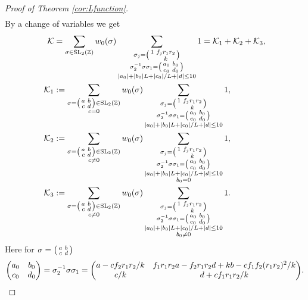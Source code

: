 \documentclass[12pt]{amsart}
\theoremstyle{definition}
\theoremstyle{remark}
\numberwithin{equation}{section}
\newcommand{\Z}{{\mathbb Z}}
\newcommand{\1}{{\mathbf 1}}
\newcommand{\SL}{\operatorname{SL}_2}
\renewcommand{\c}{\mathfrak c}
\begin{document}
\begin{proof}[Proof of Theorem \ref{cor:Lfunction}]
\begin{align*}
\end{align*}
 By a change of variables  we get
\begin{align*}
      \mathcal{K} 
 &=    \sum_{\sigma \in \SL(\Z)} w_0(\sigma) \sum_{\substack{\sigma_j =\smqty(1 & f_j r_1 r_2 \\ & k) \\ \sigma_2^{-1} \sigma \sigma_1 = \smqty(a_0 & b_0 \\c_0 & d_0 ) \\ |a_0| + |b_0| L + |c_0|/L + |d| \leq 10}} 1 
    =  \mathcal{K}_{1} + \mathcal{K}_{2} + \mathcal{K}_3, \\
      \mathcal{K}_1 &:=  \sum_{\substack{\sigma= \smqty(a & b \\ c& d) \in \SL(\Z) \\c=0}} w_0(\sigma) \sum_{\substack{\sigma_j =\smqty(1 & f_j r_1 r_2 \\ & k) \\ \sigma_2^{-1} \sigma \sigma_1 = \smqty(a_0 & b_0 \\c_0 & d_0 ) \\ |a_0| + |b_0| L + |c_0|/L + |d| \leq 10}} 1   , \\
       \mathcal{K}_2  &:=    \sum_{\substack{\sigma= \smqty(a & b \\ c& d) \in \SL(\Z) \\ c \neq 0}} w_0(\sigma) \sum_{\substack{\sigma_j =\smqty(1 & f_j r_1 r_2 \\ & k) \\ \sigma_2^{-1} \sigma \sigma_1 = \smqty(a_0 & b_0 \\c_0 & d_0 ) \\ |a_0| + |b_0| L + |c_0|/L + |d| \leq 10 \\  b_0= 0}} 1,  \\
     \mathcal{K}_3 &:=  \sum_{\substack{\sigma= \smqty(a & b \\ c& d) \in \SL(\Z) \\ c \neq 0}} w_0(\sigma) \sum_{\substack{\sigma_j =\smqty(1 & f_j r_1 r_2 \\ & k) \\ \sigma_2^{-1} \sigma \sigma_1 = \smqty(a_0 & b_0 \\c_0 & d_0 ) \\ |a_0| + |b_0| L + |c_0|/L + |d| \leq 10 \\  b_0 \neq 0}} 1.
\end{align*} 
Here for $\sigma = \smqty(a &b \\ c& d)$
\begin{align*}
   \mqty(a_0 & b_0 \\c_0 & d_0 )=  \sigma_2^{-1} \sigma \sigma_1  = \mqty(a-cf_2 r_1 r_2/k & f_1 r_1 r_2 a-f_2 r_1 r_2 d+kb-cf_1f_2 (r_1r_2)^2/k\\ c/k & d+cf_1 r_1 r_2/k).
\end{align*}


\end{proof}
\end{document}
